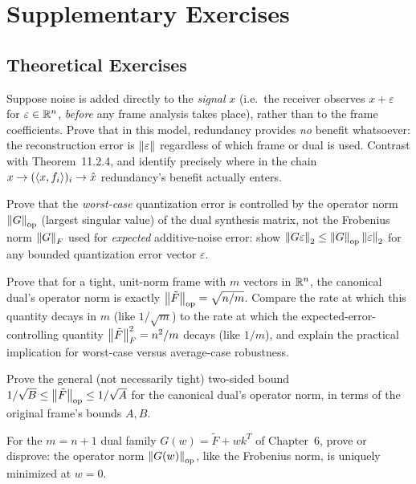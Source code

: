 \section{Supplementary Exercises}
\label{sec:extra-ch11}

\subsection*{Theoretical Exercises}
\begin{theoexercises}
	\item Suppose noise is added directly to the \emph{signal} $x$ (i.e.\
	the receiver observes $x+\varepsilon$ for $\varepsilon\in\mathbb{R}^n$,
	\emph{before} any frame analysis takes place), rather than to the
	frame coefficients. Prove that in this model, redundancy provides
	\emph{no} benefit whatsoever: the reconstruction error is
	$\left\| \varepsilon \right\|$ regardless of which frame or dual is used.
	Contrast with Theorem~11.2.4, and identify precisely where in the
	chain $x\to(\left\langle x, f_i \right\rangle)_i\to\hat x$ redundancy's benefit
	actually enters.
	
	\item Prove that the \emph{worst-case} quantization error is controlled
	by the operator norm $\left\| G \right\|_{\mathrm{op}}$ (largest singular
	value) of the dual synthesis matrix, not the Frobenius norm
	$\left\| G \right\|_F$ used for \emph{expected} additive-noise error: show
	$\left\| G\varepsilon \right\|_2\le\left\| G \right\|_{\mathrm{op}}\left\| \varepsilon \right\|_2$
	for any bounded quantization error vector $\varepsilon$.
	
	\item Prove that for a tight, unit-norm frame with $m$ vectors in
	$\mathbb{R}^n$, the canonical dual's operator norm is exactly
	$\left\| \tilde F \right\|_{\mathrm{op}}=\sqrt{n/m}$. Compare the rate at
	which this quantity decays in $m$ (like $1/\sqrt m$) to the rate
	at which the expected-error-controlling quantity
	$\left\| \tilde F \right\|_F^2=n^2/m$ decays (like $1/m$), and explain the
	practical implication for worst-case versus average-case
	robustness.
	
	\item Prove the general (not necessarily tight) two-sided bound
	$1/\sqrt B\le\left\| \tilde F \right\|_{\mathrm{op}}\le1/\sqrt A$ for the
	canonical dual's operator norm, in terms of the original frame's
	bounds $A,B$.
	
	\item For the $m=n+1$ dual family $G(w)=\tilde F+wk^T$ of Chapter~6,
	prove or disprove: the operator norm $\left\| G(w) \right\|_{\mathrm{op}}$,
	like the Frobenius norm, is uniquely minimized at $w=0$.
\end{theoexercises}

